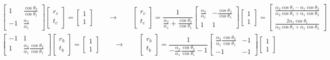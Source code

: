 \documentclass[letterpaper,10pt,english]{jupyterBook}
\begin{document}
\sphinxAtStartPar
{} 
\begin{equation*}
\begin{split}
\begin{bmatrix} 1 & \frac{\cos \theta_2}{\cos \theta_1} \\ -1 & \frac{\alpha_2}{\alpha_1} \end{bmatrix}
 \begin{bmatrix} r_c \\ t_c \end{bmatrix} = \begin{bmatrix} 1 \\ 1 \end{bmatrix}
\qquad \rightarrow \qquad
\begin{bmatrix} r_c \\ t_c \end{bmatrix} = \dfrac{1}{\frac{\alpha_2}{\alpha_1} + \frac{\cos \theta_2}{\cos \theta_1}} \begin{bmatrix} \frac{\alpha_2}{\alpha_1} & - \frac{\cos \theta_2}{\cos \theta_1} \\ 1 & 1  \end{bmatrix} \begin{bmatrix} 1 \\ 1 \end{bmatrix}
= \begin{bmatrix} \frac{\alpha_2 \cos \theta_1 - \alpha_1 \cos \theta_2}{\alpha_2 \cos \theta_1 + \alpha_1 \cos \theta_2} \\ \frac{2 \alpha_1 \cos \theta_1}{\alpha_2 \cos \theta_1 + \alpha_1 \cos \theta_2} \end{bmatrix}
\end{split}
\end{equation*}\begin{equation*}
\begin{split}
\begin{bmatrix} -1 & 1 \\ 1 & \frac{\alpha_2}{\alpha_1} \frac{\cos \theta_2}{\cos \theta_1} \end{bmatrix}
 \begin{bmatrix} r_b \\ t_b \end{bmatrix} = \begin{bmatrix} 1 \\ 1 \end{bmatrix}
\qquad \rightarrow \qquad
\begin{bmatrix} r_b \\ t_b \end{bmatrix} = \dfrac{1}{-\frac{\alpha_2}{\alpha_1} \frac{\cos \theta_2}{\cos \theta_1} - 1} \begin{bmatrix}  \frac{\alpha_2}{\alpha_1} \frac{\cos \theta_2}{\cos \theta_1} & -1 \\ -1 & -1  \end{bmatrix} \begin{bmatrix} 1 \\ 1 \end{bmatrix}

\end{split}
\end{equation*}
\end{document}
